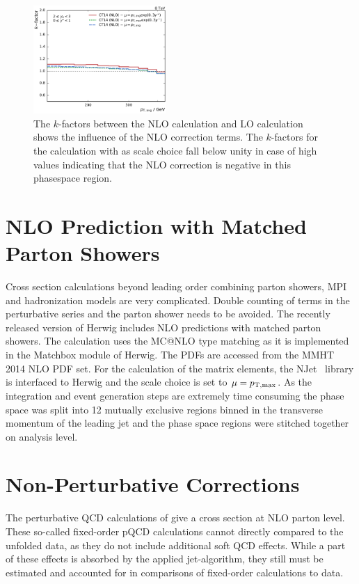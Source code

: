 \begin{figure}[htp]
    \includegraphics[width=0.45\textwidth]{figures/theory/kfactor_comp_yb2ys0.pdf}
    \caption{The $k$-factors between the NLO calculation and LO calculation
        shows the influence of the NLO correction terms. The $k$-factors for the
        calculation with \ptavg as scale choice fall below unity in case of high
        \ystar values indicating that the NLO correction is negative in this
        phasespace region.}
    \label{fig:kfactor_comp}
\end{figure}

\section{NLO Prediction with Matched Parton Showers}

Cross section calculations beyond leading order combining parton showers, MPI
and hadronization models are very complicated. Double counting of terms in the
perturbative series and the parton shower needs to be avoided. The recently
released version of Herwig includes NLO predictions with matched parton
showers. The calculation uses the MC@NLO type matching as it is implemented in
the Matchbox module of Herwig. The PDFs are accessed from the MMHT 2014 NLO PDF
set. For the calculation of the matrix elements, the NJet~\cite{njet} library is
interfaced to Herwig and the scale choice is set to $\mu = p_{\mathrm{T,max}}$. As the
integration and event generation steps are extremely time consuming the phase
space was split into 12 mutually exclusive regions binned in the transverse
momentum of the leading jet and the phase space regions were stitched together
on analysis level.

\section{Non-Perturbative Corrections}

The perturbative QCD calculations of \NLOJETPP give a cross section at NLO
parton level. These so-called fixed-order pQCD calculations cannot directly
compared to the unfolded data, as they do not include additional soft QCD
effects. While a part of these effects is absorbed by the applied jet-algorithm,
they still must be estimated and accounted for in comparisons of fixed-order
calculations to data.

